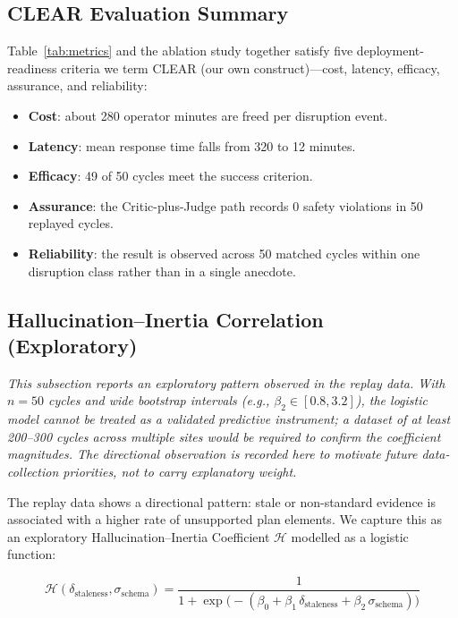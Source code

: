 \documentclass[conference]{IEEEtran}
\begin{document}
\subsection{CLEAR Evaluation Summary}

Table~\ref{tab:metrics} and the ablation study together satisfy five deployment-readiness criteria we term CLEAR (our own construct)---cost, latency, efficacy, assurance, and reliability:
\begin{itemize}
  \item \textbf{Cost}: about 280 operator minutes are freed per disruption event.
  \item \textbf{Latency}: mean response time falls from 320 to 12 minutes.
  \item \textbf{Efficacy}: 49 of 50 cycles meet the success criterion.
  \item \textbf{Assurance}: the Critic-plus-Judge path records 0 safety violations in 50 replayed cycles.
  \item \textbf{Reliability}: the result is observed across 50 matched cycles within one disruption class rather than in a single anecdote.
\end{itemize}

\subsection{Hallucination--Inertia Correlation (Exploratory)}

\emph{This subsection reports an exploratory pattern observed in the replay data. With $n = 50$ cycles and wide bootstrap intervals (e.g., $\beta_2 \in [0.8, 3.2]$), the logistic model cannot be treated as a validated predictive instrument; a dataset of at least 200--300 cycles across multiple sites would be required to confirm the coefficient magnitudes. The directional observation is recorded here to motivate future data-collection priorities, not to carry explanatory weight.}

The replay data shows a directional pattern: stale or non-standard evidence is associated with a higher rate of unsupported plan elements. We capture this as an exploratory Hallucination--Inertia Coefficient $\mathcal{H}$ modelled as a logistic function:

\begingroup\small
\begin{equation}
  \mathcal{H}(\delta_{\text{staleness}}, \sigma_{\text{schema}})
  = \frac{1}{1 + \exp\!\bigl(-(\beta_0 + \beta_1 \, \delta_{\text{staleness}} + \beta_2 \, \sigma_{\text{schema}})\bigr)}
\end{equation}
\endgroup
\end{document}
